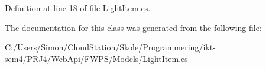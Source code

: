 Definition at line 18 of file Light\+Item.\+cs.



The documentation for this class was generated from the following file\+:\begin{DoxyCompactItemize}
\item 
C\+:/\+Users/\+Simon/\+Cloud\+Station/\+Skole/\+Programmering/ikt-\/sem4/\+P\+R\+J4/\+Web\+Api/\+F\+W\+P\+S/\+Models/\mbox{\hyperlink{_web_api_2_f_w_p_s_2_models_2_light_item_8cs}{Light\+Item.\+cs}}\end{DoxyCompactItemize}
